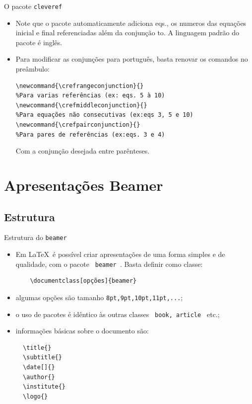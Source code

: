 \documentclass[c]{beamer}
\begin{document}
{\begin{frame}[fragile]{\sc O pacote \texttt{cleveref}}
\begin{itemize}
\item Note que o pacote automaticamente adiciona {\color{blue} eqs.}, os numeros das equações {\color{blue} inicial} e {\color{blue}final} referenciadas além da conjunção {\color{blue} to}. A linguagem padrão do pacote é inglês.
\item Para modificar as conjunções para português, basta renovar os comandos no preâmbulo:
\begin{verbatim}
\newcommand{\crefrangeconjunction}{} 
%Para varias referências (ex: eqs. 5 à 10)
\newcommand{\crefmiddleconjunction}{} 
%Para equações não consecutivas (ex:eqs 3, 5 e 10)
\newcommand{\crefpairconjunction}{}
%Para pares de referências (ex:eqs. 3 e 4) 
\end{verbatim}
Com a conjunção desejada entre parênteses. 

\end{itemize}
\end{frame}




\section{Apresentações Beamer}
\subsection{Estrutura}

\begin{frame}[fragile]{{\sc Estrutura do }\texttt{beamer}}
	\begin{itemize}
		\setlength\itemsep{0.3cm}
  \item Em \LaTeX\ é possível criar apresentações de uma forma simples e de qualidade, com o pacote \verb| beamer |. Basta definir como classe:\\
  \begin{verbatim}
	\documentclass[opções]{beamer}
  \end{verbatim}
  \item algumas opções são tamanho \verb|8pt,9pt,10pt,11pt,...|;
  \item o uso de pacotes é idêntico às outras classes \verb| book, article | etc.;
  \item informações básicas sobre o documento são:\\
\begin{verbatim}
  \title{}
  \subtitle{}
  \date[]{}
  \author{}
  \institute{}
  \logo{}
  \end{verbatim}
	\end{itemize}
\end{frame}



}
\end{document}
